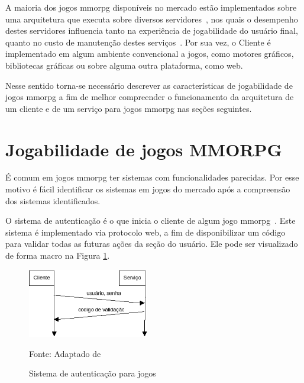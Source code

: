 A maioria dos jogos \ac{mmorpg} disponíveis no mercado estão implementados sobre uma arquitetura que executa sobre diversos servidores~\cite{stephenclarkewillson2017}, nos quais o desempenho destes servidores influencia tanto na experiência de jogabilidade do usuário final, quanto no custo de manutenção destes serviços~\cite{1417630}.
%
Por sua vez, o Cliente é implementado em algum ambiente convencional a jogos, como motores gráficos, bibliotecas gráficas ou sobre alguma outra plataforma, como web.



Nesse sentido torna-se necessário descrever as características de jogabilidade de jogos \ac{mmorpg} a fim de melhor compreender o funcionamento da arquitetura de um cliente e de um serviço para jogos \ac{mmorpg} nas seções seguintes.



\section{Jogabilidade de jogos MMORPG}
\label{sec:jogabilidade}



É comum em jogos \ac{mmorpg} ter sistemas com funcionalidades parecidas.
%
Por esse motivo é fácil identificar os sistemas em jogos do mercado após a compreensão dos sistemas identificados.



O sistema de autenticação é o que inicia o cliente de algum jogo \ac{mmorpg}~\cite{albion_online_unite, matthiasrudy2011}.
%
Este sistema é implementado via protocolo web, a fim de disponibilizar um código para validar todas as futuras ações da seção do usuário.
%
Ele pode ser visualizado de forma macro na Figura \ref{fig:autenticacao}.


\begin{figure}[htb!]
\caption{Sistema de autenticação para jogos}
\label{fig:autenticacao}
\includegraphics[height=3cm]{img/cap2/autenticacao.png}
\centering

Fonte: Adaptado de ~\cite{LeckyThompson2008Nov}
\end{figure}



